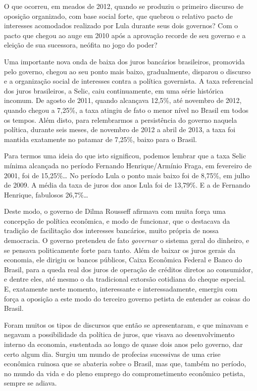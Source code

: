 O que ocorreu, em meados de 2012, quando se produziu o primeiro discurso de
oposição organizado, com base social forte, que quebrou o relativo pacto
de interesses acomodados realizado por Lula durante seus dois governos?
Com o pacto que chegou ao auge em 2010 após a aprovação recorde de seu governo
e a eleição de sua sucessora, neófita no jogo do poder?

Uma importante nova onda de baixa dos juros bancários brasileiros,
promovida pelo governo, chegou ao seu ponto mais baixo, gradualmente, disparou o
discurso e a organização social de interesses contra a política governista. A
taxa referencial dos juros brasileiros, a Selic, caiu continuamente, em
uma série histórica incomum. De agosto de 2011, quando alcançava 12,5\%,
até novembro de 2012, quando chegou a 7,25\%, a taxa atingiu de fato o
menor nível no Brasil em todos os tempos. Além disto, para relembrarmos
a persistência do governo naquela política, durante seis meses, de
novembro de 2012 a abril de 2013, a taxa foi mantida exatamente no
patamar de 7,25\%, baixo para o Brasil.

Para termos uma ideia do que isto significou, podemos lembrar que a
taxa Selic mínima alcançada no período Fernando Henrique/Armínio Fraga,
em fevereiro de 2001, foi de 15,25\%… No período Lula o ponto mais baixo
foi de 8,75\%, em julho de 2009. A média da taxa de juros dos anos Lula
foi de 13,79\%. E a de Fernando Henrique, fabulosos 26,7\%…

Deste modo, o governo de Dilma Rousseff afirmava com muita força uma
concepção de política econômica, e modo de funcionar, que o destacava da
tradição de facilitação dos interesses bancários, muito própria de nossa
democracia. O governo pretendeu de fato \emph{governar} o sistema geral
do dinheiro, e se pensava politicamente forte para tanto. Além de baixar
os juros gerais da economia, ele dirigiu os bancos públicos, Caixa
Econômica Federal e Banco do Brasil, para a queda real dos juros de
operação de créditos diretos ao consumidor, e dentre eles, até mesmo o
da tradicional extorsão cotidiana do cheque especial. E, exatamente
neste momento, interessante e interessadamente, emergiu com força a
oposição a este modo do terceiro governo petista de entender as coisas
do Brasil.

Foram muitos os tipos de discursos que então se apresentaram, e que
minavam e negavam a possibilidade da política de juros, que visava ao
desenvolvimento interno da economia, sustentada ao longo de quase dois
anos pelo governo, dar certo algum dia. Surgiu um mundo de profecias
sucessivas de uma crise econômica ruinosa que se abateria sobre o
Brasil, mas que, também no período, no mundo da vida e do pleno emprego
do comprometimento econômico petista, sempre se adiava.

